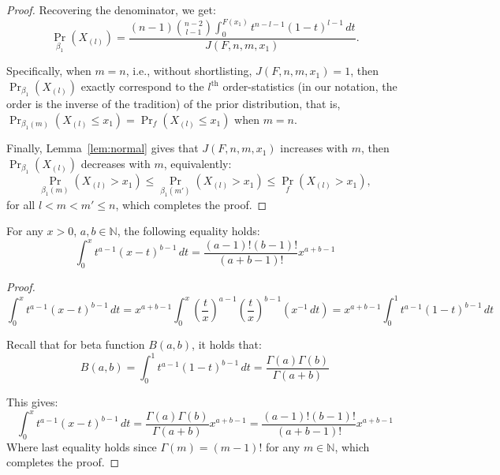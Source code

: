 \begin{proof}
    Recovering the denominator, we get:
    \[
    \Pr_{\beta_1}(X_{(l)}) = \frac{(n-1)\binom{n-2}{l-1}\int_0^{F(x_1)} t^{n-l-1}(1-t)^{l-1}\, dt}{J(F,n,m,x_1)}.
    \]

    Specifically, when $m=n$, i.e., without shortlisting, $J(F,n,m,x_1)=1$, then $\Pr_{\beta_1}(X_{(l)})$ exactly correspond to the $l^{\text{th}}$ order-statistics (in our notation, the order is the inverse of the tradition) of the prior distribution, that is, $\Pr_{\beta_1(m)}(X_{(l)} \leq x_1) = \Pr_{f}(X_{(l)}\leq x_1)$ when $m=n$.

    Finally, Lemma~\ref{lem:normal} gives that $J(F,n,m,x_1)$ increases with $m$, then $\Pr_{\beta_1}(X_{(l)})$ decreases with $m$, equivalently: 
    \[
    \Pr_{\beta_1(m)}(X_{(l)} > x_1) \leq \Pr_{\beta_1(m')}(X_{(l)} > x_1) \leq \Pr_{f}(X_{(l)} > x_1),
    \]for all $l<m<m'\leq n$, which completes the proof.
\end{proof}

\begin{lemma}\label{lem:betaUpper}
For any $x > 0$, $a,b \in \mathbb{N}$, the following equality holds:
    \[
    \int_0^{x}t^{a-1}(x-t)^{b-1}\, dt = \frac{(a-1)!(b-1)!}{(a+b-1)!}x^{a+b-1}
    \]
\end{lemma}
\begin{proof}
    \[
    \int_0^{x}t^{a-1}(x-t)^{b-1}\, dt = x^{a+b-1} \int_0^x (\frac{t}{x})^{a-1}(\frac{t}{x})^{b-1}(x^{-1} \, dt ) = x^{a+b-1} \int_{0}^{1}t^{a-1}(1-t)^{b-1}\, dt
    \]
    
    Recall that for beta function $B(a,b)$, it holds that:
    \[
    B(a,b) = \int_{0}^{1}t^{a-1}(1-t)^{b-1}\, dt = \frac{\Gamma(a)\Gamma(b)}{\Gamma(a+b)}
    \]

    This gives:
    \[
    \int_0^{x}t^{a-1}(x-t)^{b-1}\, dt = \frac{\Gamma(a)\Gamma(b)}{\Gamma(a+b)} x^{a+b-1} = \frac{(a-1)!(b-1)!}{(a+b-1)!}x^{a+b-1}
    \]
    Where last equality holds since $\Gamma(m) = (m-1)!$ for any $m\in \mathbb{N}$, which completes the proof.
\end{proof}



